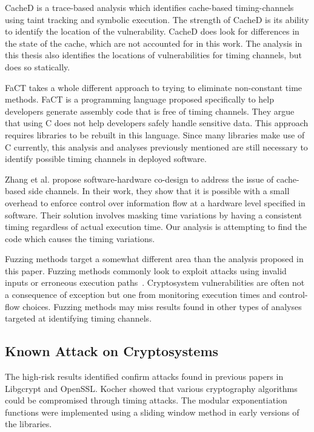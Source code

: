    CacheD is a trace-based analysis which identifies cache-based timing-channels
   using taint tracking and symbolic execution\cite{wang2017cached}. The
   strength of CacheD is its ability to identify the location of the
   vulnerability. CacheD does look for differences in the state of the cache,
   which are not accounted for in this work. The analysis in this thesis also
   identifies the locations of vulnerabilities for timing channels, but does so
   statically.

   FaCT takes a whole different approach to trying to eliminate non-constant
   time methods\cite{cauligi2017fact}. FaCT is a programming language proposed
   specifically to help developers generate assembly code that is free of timing channels.
   They argue that using C does not help developers safely handle sensitive
   data. This approach requires libraries to be rebuilt in this language. Since
   many libraries make use of C currently, this analysis and analyses previously mentioned are
   still necessary to identify possible timing channels in deployed software.

   Zhang et al. propose software-hardware co-design to address the issue of
   cache-based side channels\cite{zhang2015hardware}. In their work, they show
   that it is possible with a small overhead to enforce control over information
   flow at a hardware level specified in software. Their solution involves
   masking time variations by having a consistent timing regardless of actual
   execution time. Our analysis is attempting to find the code which causes the
   timing variations.

   Fuzzing methods target a somewhat different area than the analysis proposed
   in this paper. Fuzzing methods commonly look to exploit attacks using invalid
   inputs or erroneous execution paths~\cite{sutton2007fuzzing}. Cryptosystem vulnerabilities are often
   not a consequence of exception but one from monitoring execution times and
   control-flow choices. Fuzzing methods may miss results found in other types
   of analyses targeted at identifying timing channels.

\subsection{Known Attack on Cryptosystems}
   The high-risk results identified confirm attacks found in previous papers in
   Libgcrypt and OpenSSL. Kocher showed that various cryptography
   algorithms could be compromised through timing
   attacks\cite{kochertiming}. The modular exponentiation functions were
   implemented using a sliding window method in early versions of the libraries.


